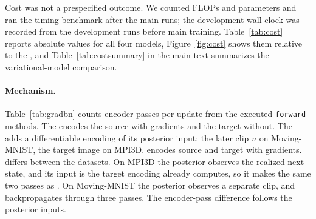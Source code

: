 \begin{table}[htbp]
\caption{Training cost per model (post hoc, secondary; $\downarrow$ lower is better; bold marks the lowest value per column and dataset, without implying a ranking of the models). ``Enc.\ passes'' are encoder forward / backward passes per update. Stored parameters and training GFLOPs per update are analytic. Time per update is from a controlled single-GPU benchmark, and wall-clock is from the one development run per model ($n=1$). Budgets were matched in updates, not in cost. The evidence sources are described below, and Table~\ref{tab:costfull} gives activation memory and the full record.}
\label{tab:cost}
\centering
\small
\setlength{\tabcolsep}{4pt}
\end{table}

Cost was not a prespecified outcome. We counted FLOPs and parameters and ran the timing benchmark after the main runs; the development wall-clock was recorded from the development runs before main training. Table~\ref{tab:cost} reports absolute values for all four models, Figure~\ref{fig:cost} shows them relative to the \emavar{}, and Table~\ref{tab:costsummary} in the main text summarizes the variational-model comparison.

\paragraph{Mechanism.} Table~\ref{tab:gradbn} counts encoder passes per update from the executed \texttt{forward} methods. The \emadet{} encodes the source with gradients and the target without. The \emavar{} adds a differentiable encoding of its posterior input: the later clip $u$ on Moving-MNIST, the target image on MPI3D. \shdet{} encodes source and target with gradients. \shvar{} differs between the datasets. On MPI3D the posterior observes the realized next state, and its input is the target encoding \shvar{} already computes, so it makes the same two passes as \shdet{}. On Moving-MNIST the posterior observes a separate clip, and \shvar{} backpropagates through three passes. The encoder-pass difference follows the posterior inputs.

